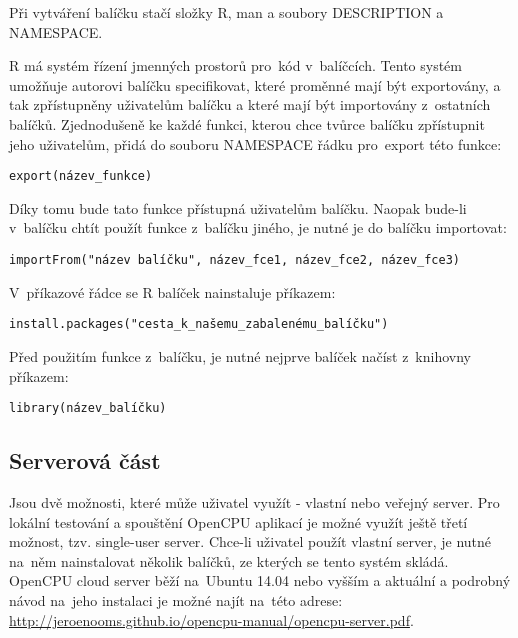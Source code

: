 \documentclass[thesis=B,czech]{FITthesis}[2012/06/26]
\begin{document}
Při vytváření balíčku stačí složky R, man a soubory DESCRIPTION a NAMESPACE.  

R má systém řízení jmenných prostorů pro~kód v~balíčcích. Tento systém umožňuje autorovi balíčku specifikovat, které proměnné mají být exportovány, a tak zpřístupněny uživatelům balíčku a které mají být importovány z~ostatních balíčků. Zjednodušeně ke každé funkci, kterou chce tvůrce balíčku zpřístupnit jeho uživatelům, přidá do souboru NAMESPACE řádku pro~export této funkce:
\begin{verbatim}
export(název_funkce)
\end{verbatim}
Díky tomu bude tato funkce přístupná uživatelům balíčku. Naopak bude-li v~balíčku chtít použít funkce z~balíčku jiného, je nutné je do balíčku importovat: 
\begin{verbatim}
importFrom("název balíčku", název_fce1, název_fce2, název_fce3)
\end{verbatim}

V~příkazové řádce se R balíček nainstaluje příkazem:
\begin{verbatim}
install.packages("cesta_k_našemu_zabalenému_balíčku")
\end{verbatim}
Před použitím funkce z~balíčku, je nutné nejprve balíček načíst z~knihovny příkazem: 
\begin{verbatim}
library(název_balíčku)
\end{verbatim}

\subsection{Serverová část}
Jsou dvě možnosti, které může uživatel využít - vlastní nebo veřejný server. Pro lokální testování a spouštění OpenCPU aplikací je možné využít ještě třetí možnost, tzv. single-user server. Chce-li uživatel použít vlastní server, je nutné na~něm nainstalovat několik balíčků, ze kterých se tento systém skládá. OpenCPU cloud server běží na~Ubuntu 14.04 nebo vyšším a aktuální a podrobný návod na~jeho instalaci je možné najít na~této adrese: \url{http://jeroenooms.github.io/opencpu-manual/opencpu-server.pdf}.
\end{document}
